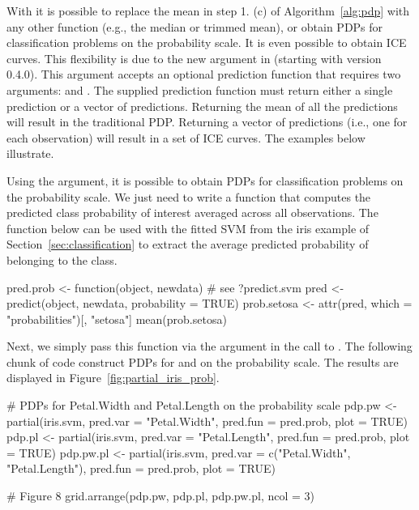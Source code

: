 With  it is possible to replace the mean in step 1. (c) of Algorithm~\ref{alg:pdp} with any other function (e.g., the median or trimmed mean), or obtain PDPs for classification problems on the probability scale. It is even possible to obtain ICE curves. This flexibility is due to the new  argument in  (starting with  version 0.4.0). This argument accepts an optional prediction function that requires two arguments:  and . The supplied prediction function must return either a single prediction or a vector of predictions. Returning the mean of all the predictions will result in the traditional PDP. Returning a vector of predictions (i.e., one for each observation) will result in a set of ICE curves. The examples below illustrate.

Using the  argument, it is possible to obtain PDPs for classification problems on the probability scale. We just need to write a function that computes the predicted class probability of interest averaged across all observations. The function below can be used with the fitted SVM from the iris example of Section~\ref{sec:classification} to extract the average predicted probability of belonging to the  class.
\begin{example}
pred.prob <- function(object, newdata) {  # see ?predict.svm
  pred <- predict(object, newdata, probability = TRUE)
  prob.setosa <- attr(pred, which = "probabilities")[, "setosa"]
  mean(prob.setosa)
}
\end{example}
Next, we simply pass this function via the  argument in the call to . The following chunk of code construct PDPs for  and  on the probability scale. The results are displayed in Figure~\ref{fig:partial_iris_prob}.
\begin{example}
# PDPs for Petal.Width and Petal.Length on the probability scale
pdp.pw <- partial(iris.svm, pred.var = "Petal.Width", pred.fun = pred.prob,
                  plot = TRUE)
pdp.pl <- partial(iris.svm, pred.var = "Petal.Length", pred.fun = pred.prob,
                  plot = TRUE)
pdp.pw.pl <- partial(iris.svm, pred.var = c("Petal.Width", "Petal.Length"),
                     pred.fun = pred.prob, plot = TRUE)

# Figure 8
grid.arrange(pdp.pw, pdp.pl, pdp.pw.pl, ncol = 3)
\end{example}

